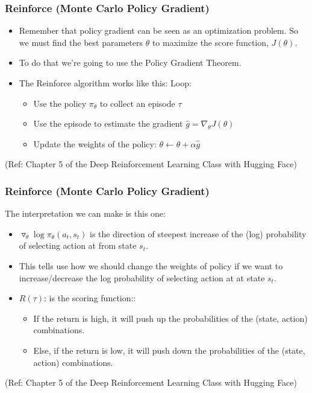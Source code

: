\begin{frame}[fragile]\frametitle{Reinforce (Monte Carlo Policy Gradient)}

\begin{itemize}
\item Remember that policy gradient can be seen as an optimization problem. So we must find the best parameters $\theta$ to maximize the score function, $J(\theta)$.

\item To do that we’re going to use the Policy Gradient Theorem. 
\item The Reinforce algorithm works like this: Loop:
\begin{itemize}
\item Use the policy $\pi_\theta$ to collect an episode $\tau$
\item Use the episode to estimate the gradient $\hat{g} = \nabla_\theta J(\theta)$ 
\item Update the weights of the policy: $\theta \leftarrow \theta + \alpha \hat{g}$
\end{itemize}
\end{itemize}

{\tiny (Ref: Chapter 5 of the Deep Reinforcement Learning Class with Hugging Face)}

\end{frame}



\begin{frame}[fragile]\frametitle{Reinforce (Monte Carlo Policy Gradient)}

The interpretation we can make is this one:

\begin{itemize}
\item $\triangledown_\theta \log\pi_\theta(a_t,s_t)$  is the direction of steepest increase of the (log) probability of selecting action at from state  $s_t$. 
\item This tells use how we should change the weights of policy if we want to increase/decrease the log probability of selecting action at at state $s_t$.
\item $R(\tau)$: is the scoring function::
\begin{itemize}
\item If the return is high, it will push up the probabilities of the (state, action) combinations.
\item Else, if the return is low, it will push down the probabilities of the (state, action) combinations.
\end{itemize}
\end{itemize}

{\tiny (Ref: Chapter 5 of the Deep Reinforcement Learning Class with Hugging Face)}

\end{frame}


